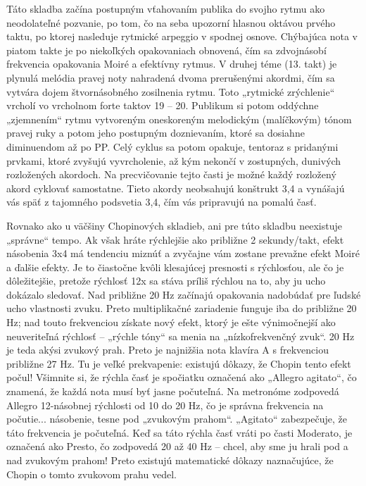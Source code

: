 \documentclass[11pt,a4paper%
]{book}
\begin{document}
Táto skladba začína postupným vťahovaním publika do svojho rytmu ako neodolateľné pozvanie, po tom, čo na seba upozorní hlasnou oktávou prvého taktu, po ktorej nasleduje rytmické arpeggio v spodnej osnove. Chýbajúca nota v piatom takte je po niekoľkých opakovaniach obnovená, čím sa zdvojnásobí frekvencia opakovania Moiré a efektívny rytmus. V druhej téme (13. takt) je plynulá melódia pravej noty nahradená dvoma prerušenými akordmi, čím sa vytvára dojem štvornásobného zosilnenia rytmu. Toto „rytmické zrýchlenie`` vrcholí vo vrcholnom forte taktov 19 -- 20. Publikum si potom oddýchne „zjemnením`` rytmu vytvoreným oneskoreným melodickým (malíčkovým) tónom pravej ruky a potom jeho postupným doznievaním, ktoré sa dosiahne diminuendom až po PP. Celý cyklus sa potom opakuje, tentoraz s pridanými prvkami, ktoré zvyšujú vyvrcholenie, až kým nekončí v zostupných, dunivých rozložených akordoch. Na precvičovanie tejto časti je možné každý rozložený akord cyklovať samostatne. Tieto akordy neobsahujú konštrukt 3,4 a vynášajú vás späť z tajomného podsvetia 3,4, čím vás pripravujú na pomalú časť.

Rovnako ako u väčšiny Chopinových skladieb, ani pre túto skladbu neexistuje „správne`` tempo. Ak však hráte rýchlejšie ako približne 2 sekundy/takt, efekt násobenia 3x4 má tendenciu miznúť a zvyčajne vám zostane prevažne efekt Moiré a ďalšie efekty. Je to čiastočne kvôli klesajúcej presnosti s rýchlosťou, ale čo je dôležitejšie, pretože rýchlosť 12x sa stáva príliš rýchlou na to, aby ju ucho dokázalo sledovať. Nad približne 20 Hz začínajú opakovania nadobúdať pre ľudské ucho vlastnosti zvuku. Preto multiplikačné zariadenie funguje iba do približne 20 Hz; nad touto frekvenciou získate nový efekt, ktorý je ešte výnimočnejší ako neuveriteľná rýchlosť -- „rýchle tóny`` sa menia na „nízkofrekvenčný zvuk``. 20 Hz je teda akýsi zvukový prah. Preto je najnižšia nota klavíra A s frekvenciou približne 27 Hz. Tu je veľké prekvapenie: existujú dôkazy, že Chopin tento efekt počul! Všimnite si, že rýchla časť je spočiatku označená ako „Allegro agitato``, čo znamená, že každá nota musí byť jasne počuteľná. Na metronóme zodpovedá Allegro 12-násobnej rýchlosti od 10 do 20 Hz, čo je správna frekvencia na počutie... násobenie, tesne pod „zvukovým prahom``. „Agitato`` zabezpečuje, že táto frekvencia je počuteľná. Keď sa táto rýchla časť vráti po časti Moderato, je označená ako Presto, čo zodpovedá 20 až 40 Hz -- chcel, aby sme ju hrali pod a nad zvukovým prahom! Preto existujú matematické dôkazy naznačujúce, že Chopin o tomto zvukovom prahu vedel.
\end{document}
